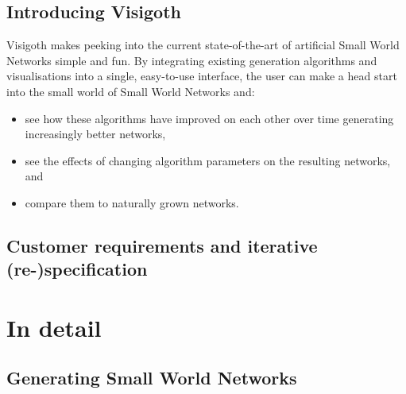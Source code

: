 \documentclass[a4paper,11pt,titlepage]{article}
\let\stdsection\section         %
\renewcommand{\section}{\newpage\stdsection}
\begin{document}


\subsection{Introducing Visigoth}

Visigoth makes peeking into the current state-of-the-art of artificial
Small World Networks simple and fun. By integrating existing
generation algorithms and visualisations into a single, easy-to-use
interface, the user can make a head start into the small world of
Small World Networks and:
\begin{itemize}
  \item see how these algorithms have improved on each other over time
    generating increasingly better networks,
  \item see the effects of changing algorithm parameters on the
    resulting networks, and
  \item compare them to naturally grown networks.
\end{itemize}

\subsection{Customer requirements and iterative (re-)specification}

%
%



\section{In detail}

\subsection{Generating Small World Networks}
\end{document}

